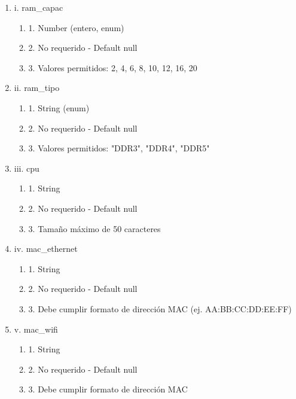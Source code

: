 \begin{enumerate}
\begin{enumerate}
            \begin{enumerate}
                \item i. ram\_capac
                    \begin{enumerate}
                        \item 1. Number (entero, enum)
                        \item 2. No requerido - Default null
                        \item 3. Valores permitidos: 2, 4, 6, 8, 10, 12, 16, 20
                    \end{enumerate}
                \item ii. ram\_tipo
                    \begin{enumerate}
                        \item 1. String (enum)
                        \item 2. No requerido - Default null
                        \item 3. Valores permitidos: "DDR3", "DDR4", "DDR5"
                    \end{enumerate}
                \item iii. cpu
                    \begin{enumerate}
                        \item 1. String
                        \item 2. No requerido - Default null
                        \item 3. Tamaño máximo de 50 caracteres
                    \end{enumerate}
                \item iv. mac\_ethernet
                    \begin{enumerate}
                        \item 1. String
                        \item 2. No requerido - Default null
                        \item 3. Debe cumplir formato de dirección MAC (ej. AA:BB:CC:DD:EE:FF)
                    \end{enumerate}
                \item v. mac\_wifi
                    \begin{enumerate}
                        \item 1. String
                        \item 2. No requerido - Default null
                        \item 3. Debe cumplir formato de dirección MAC

\end{enumerate}
\end{enumerate}
\end{enumerate}
\end{enumerate}
